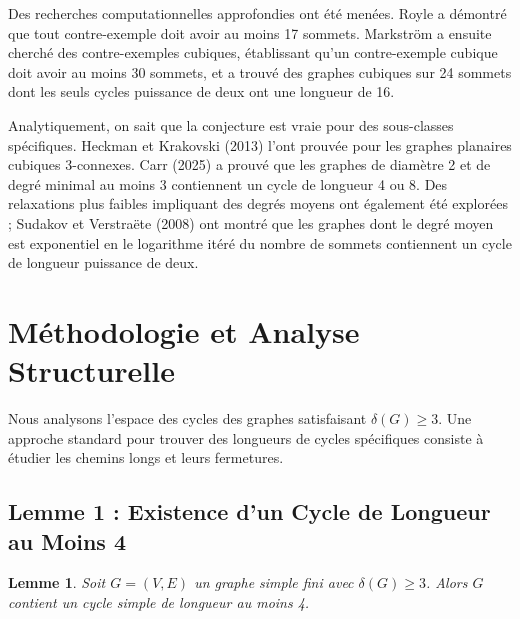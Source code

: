\documentclass[11pt, a4paper]{article}
\newtheorem{lemme}[theoreme]{Lemme}
\begin{document}
Des recherches computationnelles approfondies ont \'et\'e men\'ees. Royle a d\'emontr\'e que tout contre-exemple doit avoir au moins 17 sommets. Markstr\"om a ensuite cherch\'e des contre-exemples cubiques, \'etablissant qu'un contre-exemple cubique doit avoir au moins 30 sommets, et a trouv\'e des graphes cubiques sur 24 sommets dont les seuls cycles puissance de deux ont une longueur de 16.

Analytiquement, on sait que la conjecture est vraie pour des sous-classes sp\'ecifiques. Heckman et Krakovski (2013) l'ont prouv\'ee pour les graphes planaires cubiques 3-connexes. Carr (2025) a prouv\'e que les graphes de diam\`etre 2 et de degr\'e minimal au moins 3 contiennent un cycle de longueur 4 ou 8. Des relaxations plus faibles impliquant des degr\'es moyens ont \'egalement \'et\'e explor\'ees ; Sudakov et Verstra\"ete (2008) ont montr\'e que les graphes dont le degr\'e moyen est exponentiel en le logarithme it\'er\'e du nombre de sommets contiennent un cycle de longueur puissance de deux.

\section{M\'ethodologie et Analyse Structurelle}

Nous analysons l'espace des cycles des graphes satisfaisant $\delta(G) \ge 3$. Une approche standard pour trouver des longueurs de cycles sp\'ecifiques consiste \`a \'etudier les chemins longs et leurs fermetures.

\subsection{Lemme 1 : Existence d'un Cycle de Longueur au Moins 4}

\begin{lemme}
Soit $G = (V, E)$ un graphe simple fini avec $\delta(G) \ge 3$. Alors $G$ contient un cycle simple de longueur au moins 4.
\end{lemme}
\end{document}
